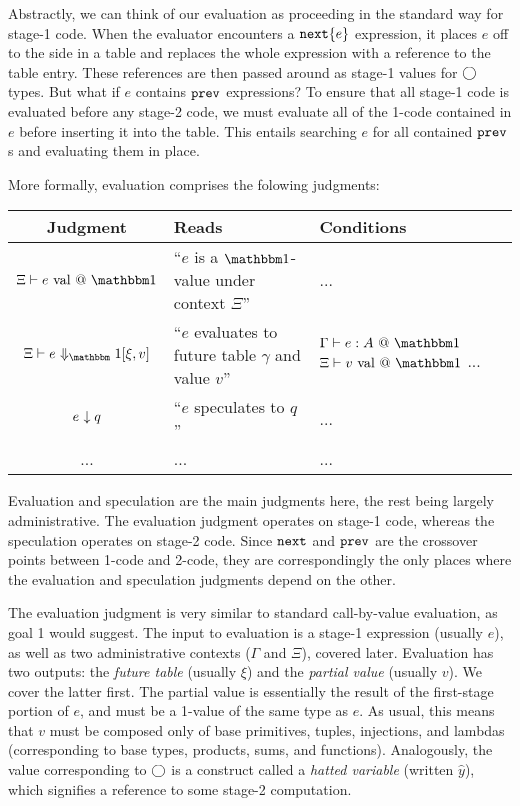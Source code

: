 \documentclass{sigplanconf}
\begin{document}
Abstractly, we can think of our evaluation as proceeding in the standard way for stage-1 code. When the evaluator encounters a ${\tt next} \{e\}$ expression, it places $e$ off to the side in a table and replaces the whole expression with a reference to the table entry.  These references are then passed around as stage-1 values for $\bigcirc$ types.  But what if $e$ contains ${\tt prev}$ expressions?  To ensure that all stage-1 code is evaluated before any stage-2 code, we must evaluate all of the 1-code contained in $e$ before inserting it into the table.  This entails searching $e$ for all contained ${\tt prev}$s and evaluating them in place.  

More formally, evaluation comprises the folowing judgments:

\begin{center}
\begin{tabular}{|c|p{2.5cm}|p{2.5cm}|} \hline
Judgment & Reads & Conditions \\ \hline 
$\isvalone e$ & ``$e$ is a $\bbone$-value under context $\Xi$'' & ... \\ \hline 
$\Xi \vdash \diaonesub$ & ``$e$ evaluates to future table $\gamma$ and value $v$'' 
& $\typesone e A$ 
	\newline $\isvalone v$ 
	\newline ... \\ \hline 
${e_{}} \downarrow {q_{}}$ & ``$e$ speculates to $q$'' & ... \\ \hline 
...&...&... \\ \hline
\end{tabular}
\end{center}

Evaluation and speculation are the main judgments here, the rest being largely administrative.  The evaluation judgment operates on stage-1 code, whereas the speculation operates on stage-2 code.  Since ${\tt next}$ and ${\tt prev}$ are the crossover points between 1-code and 2-code, they are correspondingly the only places where the evaluation and speculation judgments depend on the other. 


The evaluation judgment is very similar to standard call-by-value evaluation, as goal 1 would suggest.  The input to evaluation is a stage-1 expression (usually $e$), as well as two administrative contexts ($\Gamma$ and $\Xi$), covered later.  Evaluation has two outputs: the {\em future table} (usually $\xi$) and the {\em partial value} (usually $v$).  We cover the latter first.  The partial value is essentially the result of the first-stage portion of $e$, and must be a 1-value of the same type as $e$.  As usual, this means that $v$ must be composed only of base primitives, tuples, injections, and lambdas (corresponding to base types, products, sums, and functions).  Analogously, the value corresponding to $\bigcirc$ is a construct called a {\em hatted variable} (written $\hat y$), which signifies a reference to some stage-2 computation.  
\end{document}
